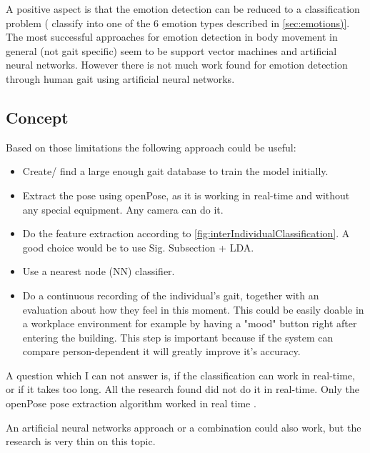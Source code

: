 \documentclass[conference]{IEEEtran}
\begin{document}
A positive aspect is that the emotion detection can be reduced to a classification problem ( classify into one of the 6 emotion types\cite{eckman2003emotions} described in \autoref{sec:emotions)}. The most successful approaches for emotion detection in body movement in general (not gait specific) seem to be support vector machines\cite{karg2012pattern,schindler2008recognizing} and artificial neural networks\cite{karg2012pattern, kapur2005gesture}. However there is not much work found for emotion detection through human gait using artificial neural networks\cite{janssen2008recognition}.

\subsection{Concept}
\label{subsec:proposedModel}
Based on those limitations the following approach could be useful:
\begin{itemize}
\item{Create/ find a large enough gait database to train the model initially.}
\item{Extract the pose using openPose\cite{cao2017realtime}, as it is working in real-time and without any special equipment. Any camera can do it.}
\item{Do the feature extraction according to \autoref{fig:interIndividualClassification}. A good choice would be to use Sig. Subsection + LDA\cite{karg2012pattern}.}
\item{Use a nearest node (NN) classifier\cite{karg2012pattern}.}
\item{Do a continuous recording of the individual's gait, together with an evaluation about how they feel in this moment. This could be easily doable in a workplace environment for example by having a "mood" button right after entering the building. This step is important because if the system can compare person-dependent it will greatly improve it's accuracy.}
\end{itemize}

A question which I can not answer is, if the classification can work in real-time, or if it takes too long. All the research found did not do it in real-time. Only the openPose pose extraction algorithm worked in real time \cite{cao2017realtime}.\

An artificial neural networks approach or a combination could also work, but the research is very thin on this topic\cite{janssen2008recognition,karg2012pattern}.
\end{document}
